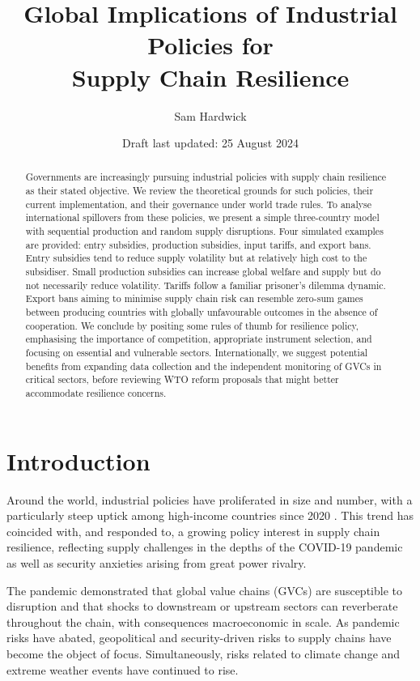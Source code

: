 \documentclass{article}
\title{Global Implications of Industrial Policies for \\ Supply Chain Resilience}
\author{Sam Hardwick}
\date{Draft last updated: 25 August 2024}
\begin{document}
\begin{titlingpage}
    \maketitle
    \begin{abstract}
        Governments are increasingly pursuing industrial policies with supply chain resilience as their stated objective. We review the theoretical grounds for such policies, their current implementation, and their governance under world trade rules. To analyse international spillovers from these policies, we present a simple three-country model with sequential production and random supply disruptions. Four simulated examples are provided: entry subsidies, production subsidies, input tariffs, and export bans. Entry subsidies tend to reduce supply volatility but at relatively high cost to the subsidiser. Small production subsidies can increase global welfare and supply but do not necessarily reduce volatility. Tariffs follow a familiar prisoner's dilemma dynamic. Export bans aiming to minimise supply chain risk can resemble zero-sum games between producing countries with globally unfavourable outcomes in the absence of cooperation. We conclude by positing some rules of thumb for resilience policy, emphasising the importance of competition, appropriate instrument selection, and focusing on essential and vulnerable sectors. Internationally, we suggest potential benefits from expanding data collection and the independent monitoring of GVCs in critical sectors, before reviewing WTO reform proposals that might better accommodate resilience concerns.
    \end{abstract}
\end{titlingpage}

\section{Introduction}

Around the world, industrial policies have proliferated in size and number, with a particularly steep uptick among high-income countries since 2020 \parencite{ilyina_industrial_2024}. This trend has coincided with, and responded to, a growing policy interest in supply chain resilience, reflecting supply challenges in the depths of the COVID-19 pandemic as well as security anxieties arising from great power rivalry.

The pandemic demonstrated that global value chains (GVCs) are susceptible to disruption and that shocks to downstream or upstream sectors can reverberate throughout the chain, with consequences macroeconomic in scale. As pandemic risks have abated, geopolitical and security-driven risks to supply chains have become the object of focus. Simultaneously, risks related to climate change and extreme weather events have continued to rise.
\end{document}
